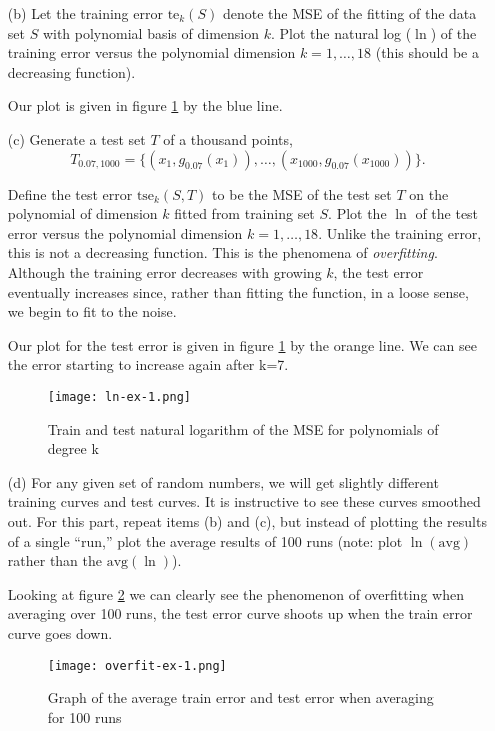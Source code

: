 \documentclass{article}
\begin{document}
\begin{enumerate}
    \item[(b)] Let the training error \(\text{te}_k(S)\) denote the MSE of the fitting of the data set \(S\) with polynomial basis of dimension \(k\). Plot the natural log (\(\ln\)) of the training error versus the polynomial dimension \(k = 1, \ldots, 18\) (this should be a decreasing function).

    Our plot is given in figure \ref{lnMSE} by the blue line.

    \item [(c)] Generate a test set \(T\) of a thousand points,
    \[
    T_{0.07,1000} = \{(x_1, g_{0.07}(x_1)), \ldots, (x_{1000}, g_{0.07}(x_{1000}))\}. \tag{9}
    \]
    
    Define the test error \(\text{tse}_k(S, T)\) to be the MSE of the test set \(T\) on the polynomial of dimension \(k\) fitted from training set \(S\). Plot the \(\ln\) of the test error versus the polynomial dimension \(k = 1, \ldots, 18\). Unlike the training error, this is not a decreasing function. This is the phenomena of \emph{overfitting}. Although the training error decreases with growing \(k\), the test error eventually increases since, rather than fitting the function, in a loose sense, we begin to fit to the noise.

    Our plot for the test error is given in figure \ref{lnMSE} by the orange line. We can see the error starting to increase again after k=7.

    \begin{figure}[H]
        \centering
        \texttt{[image: ln-ex-1.png]}
        \caption{Train and test natural logarithm of the MSE for polynomials of degree k}
        \label{lnMSE}
    \end{figure}


    \item [(d)] For any given set of random numbers, we will get slightly different training curves and test curves. It is instructive to see these curves smoothed out. For this part, repeat items (b) and (c), but instead of plotting the results of a single ``run,'' plot the average results of 100 runs (note: plot \(\ln(\text{avg})\) rather than the \(\text{avg}(\ln)\)).

    Looking at figure \ref{overfit-1} we can clearly see the phenomenon of overfitting when averaging over 100 runs, the test error curve shoots up when the train error curve goes down.

    \begin{figure}[H]
        \centering
        \texttt{[image: overfit-ex-1.png]}
        \caption{Graph of the average train error and test error when averaging for 100 runs}
        \label{overfit-1}
    \end{figure}


\end{enumerate}
\end{document}
